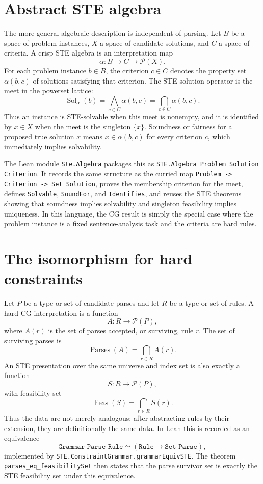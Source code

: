 \documentclass[11pt]{article}
\begin{document}
\section{Abstract STE algebra}
The more general algebraic description is independent of parsing.  Let $B$ be a
space of problem instances, $X$ a space of candidate solutions, and $C$ a space
of criteria.  A crisp STE algebra is an interpretation map
\[
  \alpha : B \to C \to \mathcal P(X).
\]
For each problem instance $b\in B$, the criterion $c\in C$ denotes the property
set $\alpha(b,c)$ of solutions satisfying that criterion.  The STE solution
operator is the meet in the powerset lattice:
\[
  \operatorname{Sol}_\alpha(b) = \bigwedge_{c\in C} \alpha(b,c)
  = \bigcap_{c\in C} \alpha(b,c).
\]
Thus an instance is STE-solvable when this meet is nonempty, and it is
identified by $x\in X$ when the meet is the singleton $\{x\}$.  Soundness or
fairness for a proposed true solution $x$ means $x\in\alpha(b,c)$ for every
criterion $c$, which immediately implies solvability.

The Lean module \texttt{Ste.Algebra} packages this as
\texttt{STE.Algebra Problem Solution Criterion}.  It records the same structure
as the curried map \texttt{Problem -> Criterion -> Set Solution}, proves the
membership criterion for the meet, defines \texttt{Solvable}, \texttt{SoundFor},
and \texttt{Identifies}, and reuses the STE theorems showing that soundness
implies solvability and singleton feasibility implies uniqueness.  In this
language, the CG result is simply the special case where the problem instance is
a fixed sentence-analysis task and the criteria are hard rules.

\section{The isomorphism for hard constraints}
Let $P$ be a type or set of candidate parses and let $R$ be a type or set of
rules.  A hard CG interpretation is a function
\[
  A : R \to \mathcal P(P),
\]
where $A(r)$ is the set of parses accepted, or surviving, rule $r$.  The set of
surviving parses is
\[
  \operatorname{Parses}(A) = \bigcap_{r\in R} A(r).
\]
An STE presentation over the same universe and index set is also exactly a
function
\[
  S : R \to \mathcal P(P),
\]
with feasibility set
\[
  \operatorname{Feas}(S) = \bigcap_{r\in R} S(r).
\]
Thus the data are not merely analogous: after abstracting rules by their
extension, they are definitionally the same data.  In Lean this is recorded as
an equivalence
\[
  \texttt{Grammar Parse Rule} \simeq (\texttt{Rule} \to \texttt{Set Parse}),
\]
implemented by \texttt{STE.ConstraintGrammar.grammarEquivSTE}.  The theorem
\texttt{parses\_eq\_feasibilitySet} then states that the parse survivor set is
exactly the STE feasibility set under this equivalence.
\end{document}
